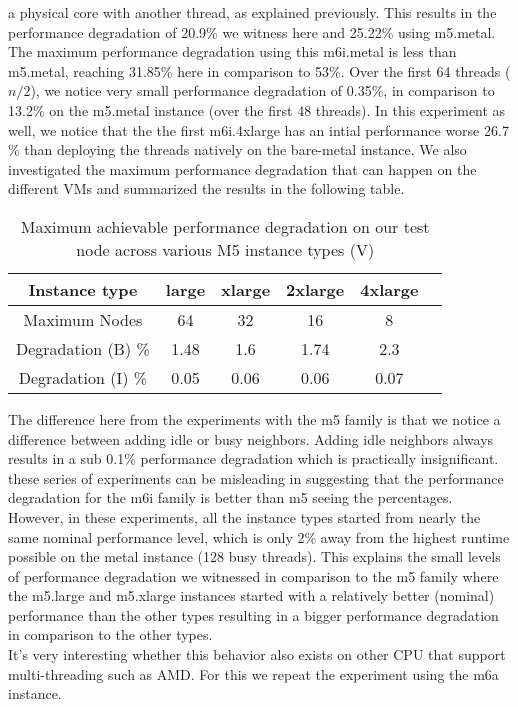 a physical core with another thread, as explained previously. This results in the performance degradation 
of 20.9\% we witness here and 25.22\% using m5.metal. The maximum performance degradation using this 
m6i.metal is less than m5.metal, reaching 31.85\% here in comparison to 53\%. Over the first 64 
threads (\begin{math}n/2\end{math}), we notice very small performance degradation of 0.35\%, in 
comparison to 13.2\% on the m5.metal instance (over the first 48 threads). In this experiment as well, 
we notice that the the first m6i.4xlarge has an intial performance worse 26.7 \% than deploying the 
threads natively on the bare-metal instance.
We also investigated the maximum performance degradation that can happen on the different VMs and 
summarized the results in the following table. 
\begin{table}[H]
\begin{center}
\begin{tabular}{ c|c|c|c|c|c }
 Instance type & large & xlarge & 2xlarge & 4xlarge \\
 \hline
 Maximum Nodes & 64 & 32 & 16 & 8  \\
 \hline
Degradation (B) \% & 1.48 & 1.6 & 1.74 & 2.3  \\ 
\hline 
Degradation (I) \% & 0.05 & 0.06 & 0.06 & 0.07  \\ 
\end{tabular}
\end{center}
\caption{Maximum achievable performance degradation on our test node across various M5 instance types (V)}
\end{table}
\noindent
The difference here from the experiments with the m5 family is that we notice a difference between adding 
idle or busy neighbors. Adding idle neighbors always results in a sub 0.1\% performance degradation which 
is practically insignificant. these series of experiments can be misleading in suggesting that the 
performance degradation for the m6i family is better than m5 seeing the percentages. However, 
in these experiments, all the instance types started from nearly the same nominal performance level, 
which is only 2\% away from the highest runtime possible on the metal instance (128 busy threads). 
This explains the small levels of performance degradation we witnessed in comparison to the m5 family 
where the m5.large and m5.xlarge instances started with a relatively better (nominal) performance than 
the other types resulting in a bigger performance degradation in comparison to the other types. \\
It's very interesting whether this behavior also exists on other CPU that support multi-threading such 
as AMD. For this we repeat the experiment using the m6a instance. 
